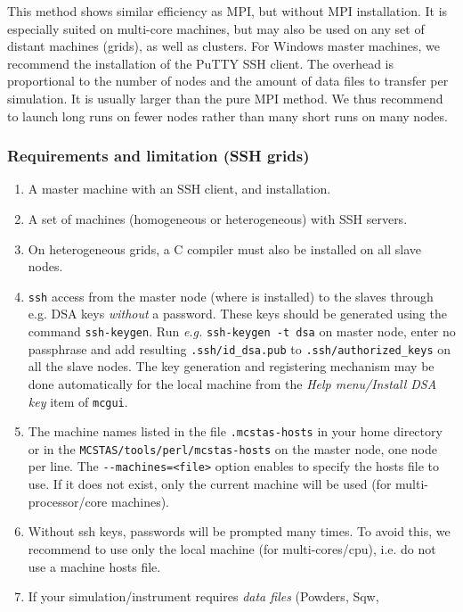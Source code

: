 This method shows similar efficiency as MPI, but without MPI installation. It is
especially suited on multi-core machines, but may also be used on any set of
distant machines (grids), as well as clusters. For Windows master machines, we
recommend the installation of the PuTTY SSH client. The overhead is proportional
to the number of nodes and the amount of data files to transfer per
simulation. It is usually larger than the pure MPI method. We thus recommend to
launch long runs on fewer nodes rather than many short runs on many nodes.

\subsubsection{Requirements and limitation (SSH grids)}

  \begin{enumerate}
  \item{A master machine with an SSH client, and \MCS installation.}
  \item{A set of machines (homogeneous or heterogeneous) with SSH servers.}
  \item{On heterogeneous grids, a C compiler must also be installed on all slave
      nodes.}
  \item{\texttt{ssh} access from the master node (where \MCS is
      installed) to the slaves through e.g. DSA keys \emph{without} a
      password. These keys should be generated using the command
      \texttt{ssh-keygen}. Run \emph{e.g.} \texttt{ssh-keygen -t dsa} on
      master node, enter no passphrase and add resulting
      \texttt{.ssh/id\_dsa.pub} to \texttt{.ssh/authorized\_keys}
      on all the slave nodes. The key generation and registering mechanism
      may be done automatically for the local machine from the
      \emph{Help menu/Install DSA key} item of \verb+mcgui+.}
  \item{
      The machine names listed in the file \texttt{.mcstas-hosts} in
      your home directory or in the \texttt{MCSTAS/tools/perl/mcstas-hosts} on
      the master node, one node per line. The \verb'--machines=<file>' option
      enables to specify the hosts file to use. If it does not exist, only
      the current machine will be used (for multi-processor/core machines).}
  \item{Without ssh keys, passwords will be prompted many times. To avoid this,
      we recommend to use only the local machine (for multi-cores/cpu), i.e. do
      not use a machine hosts file.}
  \item{If your simulation/instrument requires \emph{data files} (Powders, Sqw,
}
\end{enumerate}
